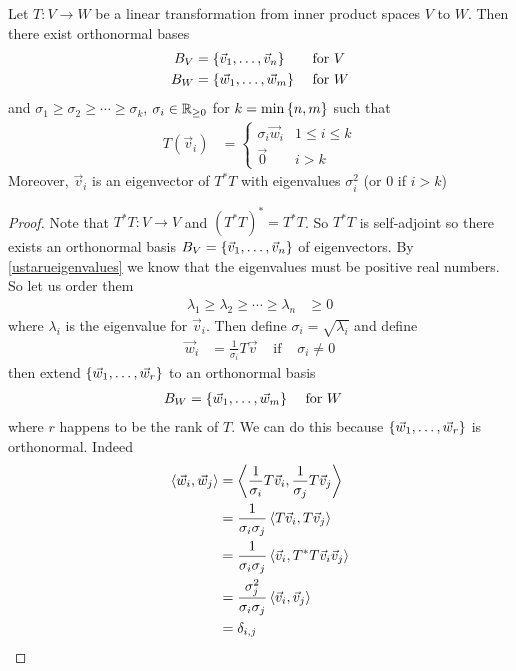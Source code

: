 \begin{theorem}
  Let $T : V \to W$ be a linear transformation from inner product spaces $V$ to $W$.
  Then there exist orthonormal bases
    \begin{align}
      B_V &= \left\{\vec v_1,\ldots,\vec v_n\right\} & \text{ for }& V \\
      B_W &= \left\{\vec w_1,\ldots,\vec w_m\right\} & \text{ for }& W
    \end{align}
  and $\sigma_1\ge\sigma_2\ge \cdots \ge \sigma_k$, $\sigma_i \in \mathbb{R}_{\ge 0}$ for $k = \min\left\{n,m\right\}$ such that
    \begin{align}
      T(\vec v_i) &= \begin{cases}
        \sigma_i \vec w_i & 1 \le i \le k \\
        \vec 0            & i > k
      \end{cases}
    \end{align}
  Moreover, $\vec v_i$ is an eigenvector of $T^*T$ with eigenvalues $\sigma_i^2$ (or 0 if $i > k$)
\end{theorem}
\begin{proof}
  Note that $T^*T : V \to V$ and $(T^*T)^* = T^*T$. So $T^*T$ is self-adjoint so there exists an orthonormal basis $B_V = \left\{\vec v_1,\ldots,\vec v_n\right\}$
  of eigenvectors. By \ref{ustarueigenvalues} we know that the eigenvalues must be positive real numbers. So let us order them
    \begin{align}
      \lambda_1 \ge \lambda_2 \ge \cdots \ge \lambda_n &\ge 0
    \end{align}
  where $\lambda_i$ is the eigenvalue for $\vec v_i$. Then define $\sigma_i = \sqrt{\lambda_i}$ and define
    \begin{align}
      \vec w_i &= \frac{1}{\sigma_i}T\vec v & \text{ if }& \sigma_i \ne 0
    \end{align}
  then extend $\left\{\vec w_1,\ldots,\vec w_r\right\}$ to an orthonormal basis
    \begin{align}
      B_W &= \left\{ \vec w_1,\ldots,\vec w_m \right\} & \text{ for }& W
    \end{align}
  where $r$ happens to be the rank of $T$. We can do this because $\left\{\vec w_1,\ldots,\vec w_r\right\}$ is orthonormal. Indeed
    \begin{align}
      \left\langle \vec w_i , \vec w_j \right\rangle
        &= \left\langle \frac1{\sigma_i}T\vec v_i , \frac1{\sigma_j}T\vec v_j \right\rangle \\
        &= \frac{1}{\sigma_i\sigma_j}\left\langle T\vec v_i , T\vec v_j \right\rangle \\
        &= \frac{1}{\sigma_i\sigma_j}\left\langle \vec v_i , T^*T\vec v_i\vec v_j \right\rangle \\
        &= \frac{\sigma_j^2}{\sigma_i\sigma_j}\left\langle \vec v_i , \vec v_j \right\rangle \\
        &= \delta_{i,j}
    \end{align}
\end{proof}

